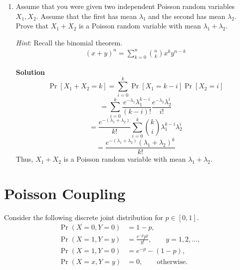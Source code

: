\documentclass[11pt]{article}
\newcommand*{\Question}[1]{\section{#1}}
\newenvironment{Parts}{\begin{enumerate}[label=(\alph*)]}{\end{enumerate}}
\newcommand*{\Part}{\item}
\newenvironment{Answer}{\vspace{10pt}\begin{mdframed}\textbf{Solution}\\}{\end{mdframed}\vfill\pagebreak[3]}
\newenvironment{Answer}{\vspace{10pt}}{\vfill\pagebreak[3]}
\begin{document}
\begin{Parts}
	\Part Assume that you were given two independent Poisson random variables $X_1, X_2$. Assume that the first has mean $\lambda_1$ and the second has mean $\lambda_2$. Prove that $X_1+X_2$ is a Poisson random variable with mean $\lambda_1+\lambda_2$.

	\textit{Hint}: Recall the binomial theorem.
	\begin{align*}
	    (x + y)^n = \sum_{k=0}^n \binom{n}{k} x^k y^{n-k}
	\end{align*}
	\begin{Answer}
    $$\Pr[X_1+X_2=k]=\sum_{i=0}^k\Pr[X_1=k-i]\Pr[X_2=i]$$
    $$=\sum_{i=0}^k\frac{e^{-\lambda_1}\lambda_1^{k-i}}{(k-i)!}\frac{e^{-\lambda_2}\lambda_2^i}{i!}$$
    $$=\frac{e^{-(\lambda_1+\lambda_2)}}{k!}\sum_{i=0}^k\binom{k}{i}\lambda_1^{k-i}\lambda_2^i$$
    $$=\frac{e^{-(\lambda_1+\lambda_2)}(\lambda_1+\lambda_2)^k}{k!}$$
    Thus, $X_1+X_2$ is a Poisson random variable with mean $\lambda_1+\lambda_2$.
	\end{Answer}
\end{Parts}


\Question{Poisson Coupling}

Consider the following discrete joint distribution for $p \in [0, 1]$.
\begin{align*}
    \Pr(X=0, Y=0) &= 1-p, \\
    \Pr(X=1, Y=y) &= \frac{e^{-p} p^y}{y!}, \qquad y = 1, 2, \dotsc, \\
    \Pr(X=1, Y=0) &= e^{-p} - (1-p), \\
    \Pr(X=x, Y=y) &= 0, \qquad \text{otherwise}.
\end{align*}
\end{document}
